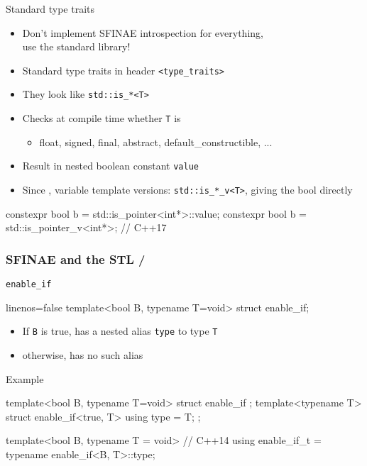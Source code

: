 \begin{frame}[fragile]
  \begin{block}{Standard type traits}
    \begin{itemize}
    \item Don't implement SFINAE introspection for everything,\\
          use the standard library!
    \item Standard type traits in header \texttt{<type_traits>}
    \item They look like \texttt{std::is_*<T>}
    \item Checks at compile time whether \texttt{T} is
    \begin{itemize}
      \item float, signed, final, abstract, default\_constructible, ...
    \end{itemize}
    \item Result in nested boolean constant \texttt{value}
    \item Since , variable template versions: \texttt{std::is_*_v<T>}, giving the bool directly
    \end{itemize}
  \end{block}
  \begin{cppcode*}{}
    constexpr bool b = std::is_pointer<int*>::value;
    constexpr bool b = std::is_pointer_v<int*>; // C++17
  \end{cppcode*}
\end{frame}

\begin{frame}[fragile]
  \frametitle{SFINAE and the STL \hfill {}/}
  \begin{block}{\texttt{enable\_if} }
    \begin{cppcode*}{linenos=false}
      template<bool B, typename T=void>
      struct enable_if;
    \end{cppcode*}
    \begin{itemize}
    \item If \texttt{B} is true, has a nested alias \texttt{type} to type \texttt{T}
    \item otherwise, has no such alias
    \end{itemize}
  \end{block}
  \begin{exampleblock}{Example}
    \begin{cppcode*}{}
      template<bool B, typename T=void>
      struct enable_if {};
      template<typename T>
      struct enable_if<true, T> { using type = T; };

      template<bool B, typename T = void> // C++14
      using enable_if_t = typename enable_if<B, T>::type;
    \end{cppcode*}
  \end{exampleblock}
\end{frame}

